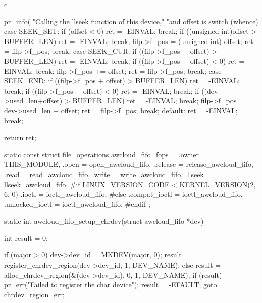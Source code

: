 \begin{code-block}{c}
{{        pr_info(
                "Calling the llseek function of this device,"
                "and offset is %
        switch (whence) {
        case SEEK_SET:
                if (offset < 0) {
                        ret = -EINVAL;
                        break;
                }
                if ((unsigned int)offset > BUFFER_LEN) {
                        ret = -EINVAL;
                        break;
                }
                filp->f_pos = (unsigned int) offset;
                ret = filp->f_pos;
                break;
        case SEEK_CUR:
                if ((filp->f_pos + offset) > BUFFER_LEN) {
                        ret = -EINVAL;
                        break;
                }
                if ((filp->f_pos + offset) < 0) {
                        ret = -EINVAL;
                        break;
                }
                filp->f_pos += offset;
                ret = filp->f_pos;
                break;
        case SEEK_END:
                if ((filp->f_pos + offset) > BUFFER_LEN) {
                        ret = -EINVAL;
                        break;
                }
                if ((filp->f_pos + offset) < 0) {
                        ret = -EINVAL;
                        break;
                }
                if ((dev->used_len+offset) > BUFFER_LEN) {
                        ret = -EINVAL;
                        break;
                }
                filp->f_pos = dev->used_len + offset;
                ret = filp->f_pos;
                break;
        default:
                ret = -EINVAL;
                break;
        }

        return ret;
}

static const struct file_operations awcloud_fifo_fops = {
        .owner          = THIS_MODULE,
        .open           = open_awcloud_fifo,
        .release        = release_awcloud_fifo,
        .read           = read_awcloud_fifo,
        .write          = write_awcloud_fifo,
        .llseek         = llseek_awcloud_fifo,
#if LINUX_VERSION_CODE < KERNEL_VERSION(2, 6, 0)
        .ioctl          = ioctl_awcloud_fifo,
#else
        .compat_ioctl   = ioctl_awcloud_fifo,
        .unlocked_ioctl = ioctl_awcloud_fifo,
#endif
};

static int awcloud_fifo_setup_chrdev(struct awcloud_fifo *dev)
{
        int result = 0;

        if (major > 0) {
                dev->dev_id = MKDEV(major, 0);
                result = register_chrdev_region(dev->dev_id, 1, DEV_NAME);
        } else {
                result = alloc_chrdev_region(&(dev->dev_id), 0, 1, DEV_NAME);
        }
        if (result) {
                pr_err("Failed to register the char device\n");
                result = -EFAULT;
                goto chrdev_region_err;
        }

}}
\end{code-block}
